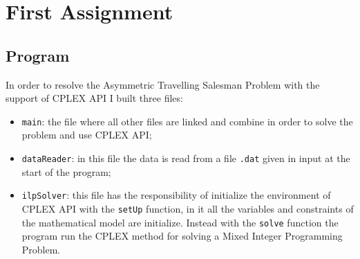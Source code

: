 \section{First Assignment}

	\subsection{Program}
		In order to resolve the Asymmetric Travelling Salesman Problem with the support of CPLEX API I built three files:
		\begin{itemize}
			\item \verb|main|: the file where all other files are linked and combine in order to solve the problem and use CPLEX API;
			\item \verb|dataReader|: in this file the data is read from a file \verb|.dat| given in input at the start of the program;
			\item \verb|ilpSolver|: this file has the responsibility of initialize the environment of CPLEX API with the \verb|setUp| function, in it all the variables and constraints of the mathematical model are initialize. Instead with the \verb|solve| function the program run the CPLEX method for solving a Mixed Integer Programming Problem.
		\end{itemize}

